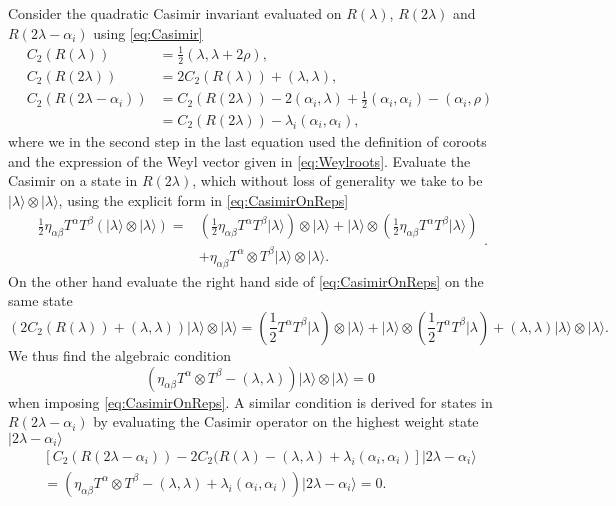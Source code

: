 Consider the quadratic Casimir invariant evaluated on $R(\lambda)$, $R(2\lambda)$ and $R(2\lambda-\alpha_i)$ using \eqref{eq:Casimir}
\begin{equation}\label{eq:CasimirOnReps}
    \begin{aligned}
        C_2(R(\lambda)) &= \frac{1}{2}(\lambda,\lambda+2\rho),\\
        C_2(R(2\lambda)) &= 2C_2(R(\lambda))+(\lambda,\lambda),\\
        C_2(R(2\lambda-\alpha_i)) &= C_2(R(2\lambda))-2(\alpha_i,\lambda)+\frac{1}{2}(\alpha_i,\alpha_i)-(\alpha_i,\rho)\\
        &= C_2(R(2\lambda))-\lambda_i(\alpha_i,\alpha_i),
    \end{aligned}
\end{equation}
where we in the second step in the last equation used the definition of coroots and the expression of the Weyl vector given in \eqref{eq:Weylroots}. Evaluate the Casimir on a state in $R(2\lambda)$, which without loss of generality we take to be $|\lambda\rangle\otimes|\lambda\rangle$, using the explicit form in \eqref{eq:CasimirOnReps}
\begin{equation}
    \begin{aligned}
    \frac{1}{2}\eta_{\alpha\beta}T^\alpha T^\beta\left(|\lambda\rangle\otimes|\lambda\rangle\right) =& \left(\frac{1}{2}\eta_{\alpha\beta}T^\alpha T^\beta |\lambda\rangle\right)\otimes|\lambda\rangle +|\lambda\rangle\otimes\left(\frac{1}{2}\eta_{\alpha\beta}T^\alpha T^\beta |\lambda\rangle\right)\\
    &+ \eta_{\alpha\beta}T^\alpha\otimes T^\beta|\lambda\rangle\otimes|\lambda\rangle. 
    \end{aligned}.
\end{equation}
On the other hand evaluate the right hand side of \eqref{eq:CasimirOnReps} on the same state
\begin{equation}
    \left(2C_2(R(\lambda))+(\lambda,\lambda)\right)|\lambda\rangle\otimes|\lambda\rangle = \left(\frac{1}{2}T^\alpha T^\beta|\lambda\right)\otimes|\lambda\rangle+|\lambda\rangle\otimes\left(\frac{1}{2}T^\alpha T^\beta|\lambda\right)+(\lambda,\lambda)|\lambda\rangle\otimes|\lambda\rangle. 
\end{equation}
We thus find the algebraic condition 
\begin{equation}\label{eq:AntiSymmetricCondition}
    \left(\eta_{\alpha\beta}T^\alpha\otimes T^\beta-(\lambda,\lambda)\right) |\lambda\rangle\otimes|\lambda\rangle=0
\end{equation}
when imposing \eqref{eq:CasimirOnReps}. A similar condition is derived for states in $R(2\lambda-\alpha_i)$ by evaluating the Casimir operator on the highest weight state $|2\lambda-\alpha_i\rangle$
\begin{equation}
    \begin{aligned}
        \left[C_2(R(2\lambda-\alpha_i))-2C_2(R(\lambda)-(\lambda,\lambda)+\lambda_i(\alpha_i,\alpha_i)\right]|2\lambda-\alpha_i\rangle\\
        =\left(\eta_{\alpha\beta}T^\alpha\otimes T^\beta-(\lambda,\lambda)+\lambda_i(\alpha_i,\alpha_i)\right)|2\lambda-\alpha_i\rangle =0.
    \end{aligned}
\end{equation}


